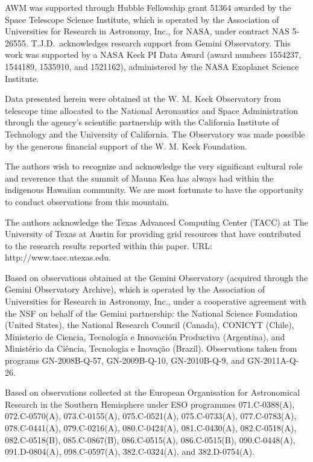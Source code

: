 \documentclass[twocolumn]{aastex62}
\begin{document}
\acknowledgements


AWM was supported through Hubble Fellowship grant 51364 awarded by the Space Telescope Science Institute, which is operated by the Association of Universities for Research in Astronomy, Inc., for NASA, under contract NAS 5-26555. T.J.D.\ acknowledges research support from Gemini Observatory. This work was supported by a NASA Keck PI Data Award (award numbers 1554237, 1544189, 1535910, and 1521162), administered by the NASA Exoplanet Science Institute. 

Data presented herein were obtained at the W. M. Keck Observatory from telescope time allocated to the National Aeronautics and Space Administration through the agency's scientific partnership with the California Institute of Technology and the University of California. The Observatory was made possible by the generous financial support of the W. M. Keck Foundation.

The authors wish to recognize and acknowledge the very significant cultural role and reverence that the summit of Mauna Kea has always had within the indigenous Hawaiian community. We are most fortunate to have the opportunity to conduct observations from this mountain.

The authors acknowledge the Texas Advanced Computing Center (TACC) at The University of Texas at Austin for providing grid resources that have contributed to the research results reported within this paper. URL: http://www.tacc.utexas.edu.

Based on observations obtained at the Gemini Observatory (acquired through the Gemini Observatory Archive), which is operated by the Association of Universities for Research in Astronomy, Inc., under a cooperative agreement with the NSF on behalf of the Gemini partnership: the National Science Foundation (United States), the National Research Council (Canada), CONICYT (Chile), Ministerio de Ciencia, Tecnolog\'{i}a e Innovaci\'{o}n Productiva (Argentina), and Minist\'{e}rio da Ci\^{e}ncia, Tecnologia e Inova\c{c}\~{a}o (Brazil). Observations taken from programs GN-2008B-Q-57, GN-2009B-Q-10, GN-2010B-Q-9, and GN-2011A-Q-26.

Based on observations collected at the European Organisation for Astronomical Research in the Southern Hemisphere under ESO programmes 071.C-0388(A), 072.C-0570(A), 073.C-0155(A), 075.C-0521(A), 075.C-0733(A), 077.C-0783(A), 078.C-0441(A), 079.C-0216(A), 080.C-0424(A), 081.C-0430(A), 082.C-0518(A), 082.C-0518(B), 085.C-0867(B), 086.C-0515(A), 086.C-0515(B), 090.C-0448(A), 091.D-0804(A), 098.C-0597(A), 382.C-0324(A), and 382.D-0754(A).
\end{document}
